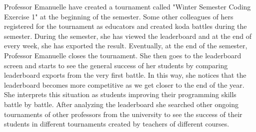 \begin{enumerate}
    Professor Emanuelle have created a tournament called "Winter Semester Coding Exercise 1" at the beginning of the semester. Some other colleagues of hers registered for the tournament as educators and created koda battles during the semester. During the semester, she has viewed the leaderboard and at the end of every week, she has exported the result. Eventually, at the end of the semester, Professor Emanuelle closes the tournament. She then goes to the leaderboard screen and starts to see the general success of her students by comparing leaderboard exports from the very first battle. In this way, she notices that the leaderboard becomes more competitive as we get closer to the end of the year. She interprets this situation as students improving their programming skills battle by battle. After analyzing the leaderboard she searched other ongoing tournaments of other professors from the university to see the success of their students in different tournaments created by teachers of different courses.
    
\end{enumerate}
\newpage
